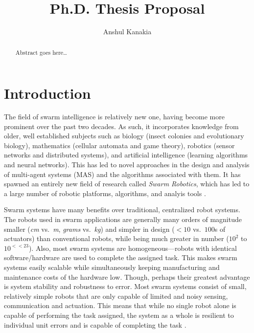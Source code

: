 \documentclass[11pt, onecolumn, compsoc, letterpaper]{article}
\begin{document}
\title{Ph.D. Thesis Proposal}
\author{Anshul Kanakia}

\maketitle

\begin{abstract}
Abstract goes here\ldots
\end{abstract}

\section{Introduction}
The field of swarm intelligence is relatively new one, having become more prominent over the past two decades. As such, it incorporates knowledge from older, well established subjects such as biology (insect colonies and evolutionary biology), mathematics (cellular automata and game theory), robotics (sensor networks and distributed systems), and artificial intelligence (learning algorithms and neural networks). This has led to novel approaches in the design and analysis of multi-agent systems (MAS) and the algorithms associated with them. It has spawned an entirely new field of research called \emph{Swarm Robotics}\cite{Sahin2005}, which has led to a large number of robotic platforms, algorithms, and analyis tools \cite{Brambilla2013}.

Swarm systems have many benefits over traditional, centralized robot systems. The robots used in swarm applications are generally many orders of magnitude smaller (\emph{cm} vs.~\emph{m}, \emph{grams} vs.~\emph{kg}) and simpler in design ($<10$ vs.~$100$s of actuators) than conventional robots, while being much greater in number ($10^2$ to $10^{<<23}$). Also, most swarm systems are homogeneous---robots with identical software/hardware are used to complete the assigned task. This makes swarm systems easily scalable while simultaneously keeping manufacturing and maintenance costs of the hardware low. Though, perhaps their greatest advantage is system stability and robustness to error. Most swarm systems consist of small, relatively simple robots that are only capable of limited and noisy sensing, communication and actuation. This means that while no single robot alone is capable of performing the task assigned, the system as a whole is resilient to individual unit errors and is capable of completing the task \cite{Winfield2005}.
\end{document}
